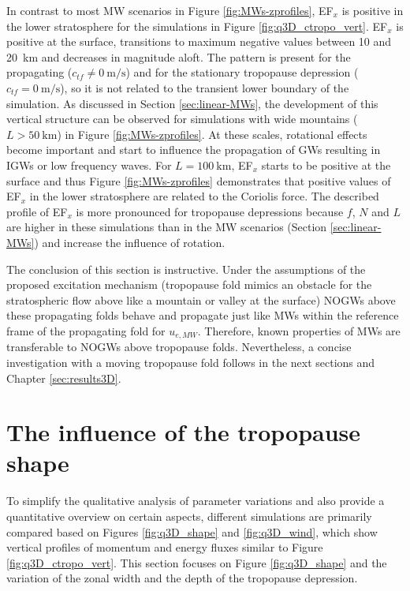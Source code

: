 In contrast to most MW scenarios in Figure \ref{fig:MWs-zprofiles}, EF$_x$ is positive in the lower stratosphere for the simulations in Figure \ref{fig:q3D_ctropo_vert}. EF$_x$ is positive at the surface,  transitions to maximum negative values between 10 and \SI{20}{\kilo\meter} and decreases in magnitude aloft. The pattern is present for the propagating ($c_{tf} \neq \SI{0}{\meter\per\second}$) and for the stationary tropopause depression ($c_{tf} = \SI{0}{\meter\per\second}$), so it is not related to the transient lower boundary of the simulation. As discussed in Section \ref{sec:linear-MWs}, the development of this vertical structure can be observed for simulations with wide mountains ($L>\SI{50}{\kilo\meter}$) in Figure \ref{fig:MWs-zprofiles}. At these scales, rotational effects become important and start to influence the propagation of GWs resulting in IGWs or low frequency waves. For $L=\SI{100}{\kilo\meter}$, EF$_x$ starts to be positive at the surface and thus Figure \ref{fig:MWs-zprofiles} demonstrates that positive values of EF$_x$ in the lower stratosphere are related to the Coriolis force. The described profile of EF$_x$ is more pronounced for tropopause depressions because $f$, $N$ and $L$ are higher in these simulations than in the MW scenarios (Section \ref{sec:linear-MWs}) and increase the influence of rotation.

The conclusion of this section is instructive. Under the assumptions of the proposed excitation mechanism (tropopause fold mimics an obstacle for the stratospheric flow above like a mountain or valley at the surface) NOGWs above these propagating folds behave and propagate just like MWs within the reference frame of the propagating fold for $u_{e,MW}$. Therefore, known properties of MWs are transferable to NOGWs above tropopause folds. Nevertheless, a concise investigation with a moving tropopause fold follows in the next sections and Chapter \ref{sec:results3D}.
%
\section{The influence of the tropopause shape}
\label{sec:q3D-shape}
To simplify the qualitative analysis of parameter variations and also provide a quantitative overview on certain aspects, different simulations are primarily compared based on Figures \ref{fig:q3D_shape} and \ref{fig:q3D_wind}, which show vertical profiles of momentum and energy fluxes similar to Figure \ref{fig:q3D_ctropo_vert}. This section focuses on Figure \ref{fig:q3D_shape} and the variation of the zonal width and the depth of the tropopause depression.


